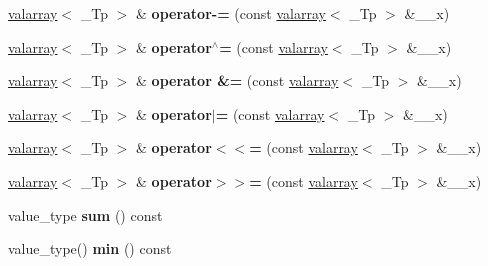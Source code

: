 \begin{DoxyCompactItemize}
\item 
\mbox{\label{classvalarray_a1e416f0a7bd4179dbdbc996ab06ad353}} 
\hyperlink{classvalarray}{valarray}$<$ \+\_\+\+Tp $>$ \& {\bfseries operator-\/=} (const \hyperlink{classvalarray}{valarray}$<$ \+\_\+\+Tp $>$ \&\+\_\+\+\_\+x)
\item 
\mbox{\label{classvalarray_af66257771649e3b5640b7e283cae32f5}} 
\hyperlink{classvalarray}{valarray}$<$ \+\_\+\+Tp $>$ \& {\bfseries operator$^\wedge$=} (const \hyperlink{classvalarray}{valarray}$<$ \+\_\+\+Tp $>$ \&\+\_\+\+\_\+x)
\item 
\mbox{\label{classvalarray_abcf9505238d65b637a76af23325b3da1}} 
\hyperlink{classvalarray}{valarray}$<$ \+\_\+\+Tp $>$ \& {\bfseries operator \&=} (const \hyperlink{classvalarray}{valarray}$<$ \+\_\+\+Tp $>$ \&\+\_\+\+\_\+x)
\item 
\mbox{\label{classvalarray_a94d89662fd3788bb96e407d0adf996e0}} 
\hyperlink{classvalarray}{valarray}$<$ \+\_\+\+Tp $>$ \& {\bfseries operator$\vert$=} (const \hyperlink{classvalarray}{valarray}$<$ \+\_\+\+Tp $>$ \&\+\_\+\+\_\+x)
\item 
\mbox{\label{classvalarray_a4e0b0c9242b054324433c0e15bc576c4}} 
\hyperlink{classvalarray}{valarray}$<$ \+\_\+\+Tp $>$ \& {\bfseries operator$<$$<$=} (const \hyperlink{classvalarray}{valarray}$<$ \+\_\+\+Tp $>$ \&\+\_\+\+\_\+x)
\item 
\mbox{\label{classvalarray_ad6dc84567c95f124f4d9cb3c9eb2511f}} 
\hyperlink{classvalarray}{valarray}$<$ \+\_\+\+Tp $>$ \& {\bfseries operator$>$$>$=} (const \hyperlink{classvalarray}{valarray}$<$ \+\_\+\+Tp $>$ \&\+\_\+\+\_\+x)
\item 
\mbox{\label{classvalarray_aed0ae2f6587d60573db51412fc0585e7}} 
value\+\_\+type {\bfseries sum} () const
\item 
\mbox{\label{classvalarray_a8309344863817818a32003c160008526}} 
value\+\_\+type() {\bfseries min} () const
\item 
\mbox{\label{classvalarray_a2734235d8ffc9de7fb83ffd5bccafddc}} 

\end{DoxyCompactItemize}

